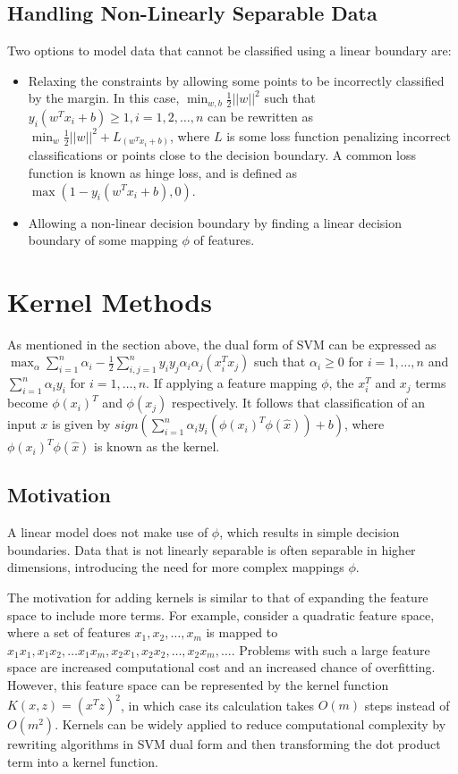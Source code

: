 \documentclass[12pt,titlepage]{article}
\let\stdsection\section
\renewcommand\section{\clearpage\stdsection}
\begin{document}
    \subsection{Handling Non-Linearly Separable Data}
      Two options to model data that cannot be classified using a linear boundary are:
      \begin{itemize}
        \item Relaxing the constraints by allowing some points to be incorrectly classified by the margin. In this case, $\min_{w,b} \frac{1}{2}||w||^2$ such that
          $y_i(w^Tx_i + b) \geq 1, i = 1, 2, \dots, n$ can be rewritten as $\min_{w} \frac{1}{2}||w||^2 + L_(w^Tx_i + b)$, where $L$ is some loss function penalizing
          incorrect classifications or points close to the decision boundary. A common loss function is known as hinge loss, and is defined as
          $\max(1 - y_i(w^Tx_i + b), 0)$.
        \item Allowing a non-linear decision boundary by finding a linear decision boundary of some mapping $\phi$ of features.
      \end{itemize}

  \section{Kernel Methods}
    As mentioned in the section above, the dual form of SVM can be expressed as $\max_{\alpha} \sum_{i=1}^n \alpha_i - \frac{1}{2} \sum_{i,j=1}^n y_i y_j \alpha_i \alpha_j(x_i^T x_j)$
    such that $\alpha_i \geq 0$ for $i = 1, \dots, n$ and $\sum_{i=1}^n \alpha_i y_i$ for $i = 1, \dots, n$. If applying a feature mapping $\phi$, the $x_i^T$ and $x_j$ terms become
    $\phi(x_i)^T$ and $\phi(x_j)$ respectively. It follows that classification of an input $x$ is given by $sign(\sum_{i=1}^n \alpha_i y_i (\phi(x_i)^T \phi(\hat{x})) + b)$, where
    $\phi(x_i)^T \phi(\hat{x})$ is known as the kernel.

    \subsection{Motivation}
      A linear model does not make use of $\phi$, which results in simple decision boundaries. Data that is not linearly separable is often separable in higher dimensions, introducing
      the need for more complex mappings $\phi$.

      The motivation for adding kernels is similar to that of expanding the feature space to include more terms. For example, consider a quadratic feature space, where a set of features
      $x_1, x_2, \dots, x_m$ is mapped to $x_1 x_1, x_1 x_2, \dots x_1 x_m, x_2 x_1, x_2 x_2, \dots, x_2 x_m, \dots$. Problems with such a large feature space are increased computational
      cost and an increased chance of overfitting. However, this feature space can be represented by the kernel function $K(x, z) = (x^Tz)^2$, in which case its calculation takes $O(m)$
      steps instead of $O(m^2)$. Kernels can be widely applied to reduce computational complexity by rewriting algorithms in SVM dual form and then transforming the dot product term
      into a kernel function.
\end{document}
